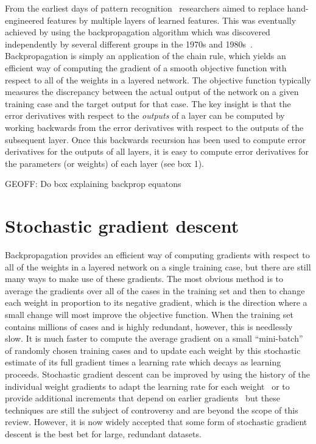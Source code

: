 \documentclass[]{article}
\begin{document}
From the earliest days of pattern recognition~\citep{selfridge,Rosenblatt57}
researchers aimed to replace hand-engineered features by multiple layers of
learned features.  This was eventually achieved by using the
backpropagation algorithm which was discovered independently by several
different groups in the 1970s and 1980s~\citep{Werbos74,Parker85,LeCun85,Rumelhart86b,schmidreference}.  
Backpropagation is simply an application of
the chain rule, which yields an efficient way of computing the gradient of a
smooth objective function with respect to all of the weights in a layered
network. The objective function typically measures the discrepancy between
the actual output of the network on a given training case and the target
output for that case.  The key insight is that the error derivatives with
respect to the {\it outputs} of a layer can be computed by working
backwards from the error derivatives with respect to the outputs of the
subsequent layer. Once this backwards recursion has been used to compute
error derivatives for the outputs of all layers, it is easy to compute
error derivatives for the parameters (or weights) of each layer (see box
1).

GEOFF: Do box explaining backprop equatons

\section{Stochastic gradient descent}

Backpropagation provides an efficient way of computing gradients with respect to all of
the weights in a layered network on a single training case, but there are
still many ways to make use of these gradients. The most obvious method is
to average the gradients over all of the cases in the training set and then
to change each weight in proportion to its negative gradient, which is the
direction where a small change will most improve the objective function. 
When the training set contains millions of cases and is highly redundant, however,
this is needlessly slow. It is much faster to compute the average gradient
on a small ``mini-batch'' of randomly chosen training cases and to update
each weight by this stochastic estimate of its full gradient times a
learning rate which decays as learning proceeds. Stochastic gradient
descent can be improved by using the history of the individual weight
gradients to adapt the learning rate for each weight~\citep{bottou-bousquet-2008-small}
or to provide additional increments that depend on earlier gradients~\citep{momentum}
but these techniques are still the subject of controversy and are beyond
the scope of this review.  However, it is now widely accepted that some
form of stochastic gradient descent is the best bet for large, redundant
datasets.
\end{document}
